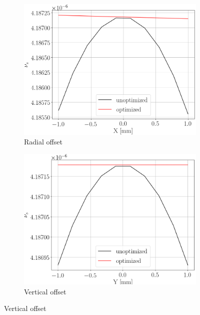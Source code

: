 \begin{figure}[!h]
	\centering
	\begin{subfigure}{\linewidth}
		\includegraphics[height=.35\paperheight]{images/decoh_sim/spin_tune_decoh_x_offset}
		\caption{Radial offset}
	\end{subfigure}
	\begin{subfigure}{\linewidth}
		\includegraphics[height=.35\paperheight]{images/decoh_sim/spin_tune_decoh_y_offset}
		\caption{Vertical offset}
	\end{subfigure}
\end{figure}
